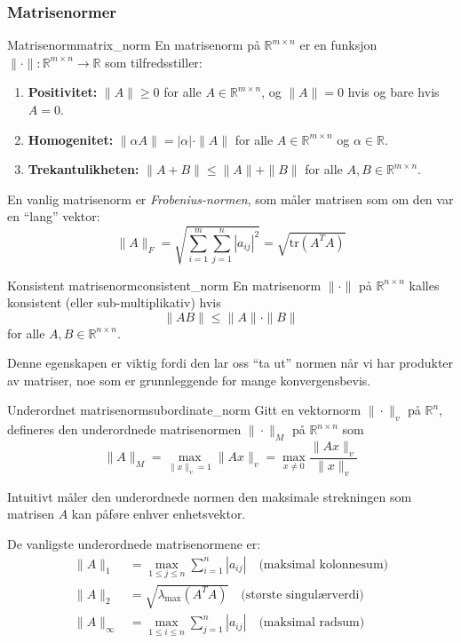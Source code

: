 \documentclass[../main.tex]{subfiles}
\begin{document}
\subsubsection{Matrisenormer}

\begin{definition}{Matrisenorm}{matrix_norm}
	En matrisenorm på $\mathbb{R}^{m \times n}$ er en funksjon $\|\cdot\| : \mathbb{R}^{m \times n} \to \mathbb{R}$ som tilfredsstiller:
	\begin{enumerate}
		\item \textbf{Positivitet:} $\|A\| \geq 0$ for alle $A \in \mathbb{R}^{m \times n}$, og $\|A\| = 0$ hvis og bare hvis $A = 0$.
		\item \textbf{Homogenitet:}
		      $\|\alpha A\| = |\alpha| \cdot \|A\|$ for alle $A \in \mathbb{R}^{m \times n}$ og $\alpha \in \mathbb{R}$.
		\item \textbf{Trekantulikheten:}
		      $\|A + B\| \leq \|A\| + \|B\|$ for alle $A,B \in \mathbb{R}^{m \times n}$.
	\end{enumerate}
\end{definition}

En vanlig matrisenorm er \emph{Frobenius-normen}, som måler matrisen som om den var en \enquote{lang} vektor:
\[
	\|A\|_F = \sqrt{\sum_{i=1}^m \sum_{j=1}^n |a_{ij}|^2} = \sqrt{\text{tr}(A^T A)}
\]

\begin{definition}{Konsistent matrisenorm}{consistent_norm}
	En matrisenorm $\|\cdot\|$ på $\mathbb{R}^{n \times n}$ kalles konsistent (eller sub-multiplikativ) hvis
	\[
		\|AB\| \leq \|A\| \cdot \|B\|
	\]
	for alle $A, B \in \mathbb{R}^{n \times n}$.
\end{definition}

Denne egenskapen er viktig fordi den lar oss \enquote{ta ut} normen når vi har produkter av matriser, noe som er grunnleggende for mange konvergensbevis.

\begin{definition}{Underordnet matrisenorm}{subordinate_norm}
	Gitt en vektornorm $\|\cdot\|_v$ på $\mathbb{R}^n$, defineres den underordnede matrisenormen $\|\cdot\|_M$ på $\mathbb{R}^{n \times n}$ som
	\[
		\|A\|_M = \max_{\|x\|_v = 1} \|Ax\|_v = \max_{x \neq 0} \frac{\|Ax\|_v}{\|x\|_v}
	\]
\end{definition}

Intuitivt måler den underordnede normen den maksimale strekningen som matrisen $A$ kan påføre enhver enhetsvektor.

De vanligste underordnede matrisenormene er:
\begin{align*}
	\|A\|_1      & = \max_{1 \leq j \leq n} \sum_{i=1}^n |a_{ij}| \quad \text{(maksimal kolonnesum)} \\
	\|A\|_2      & = \sqrt{\lambda_{\max}(A^T A)} \quad \text{(største singulærverdi)}               \\
	\|A\|_\infty & = \max_{1 \leq i \leq n} \sum_{j=1}^n |a_{ij}| \quad \text{(maksimal radsum)}
\end{align*}
\end{document}
